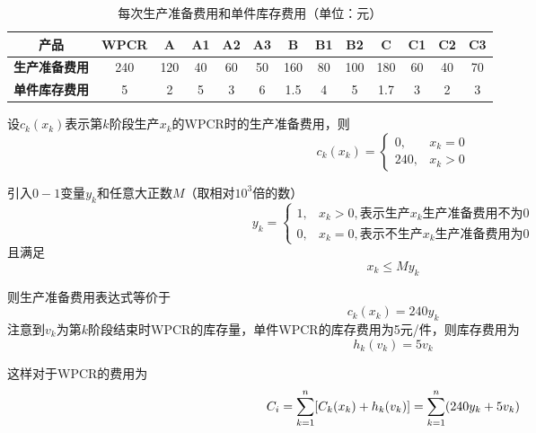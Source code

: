 \begin{table}[!hpt]
    \caption{每次生产准备费用和单件库存费用（单位：元）}
    \label{T.ch2-1}
    \centering
    \renewcommand\arraystretch{1.5} 
    \begin{tabular}{@{}ccccccccccccc@{}} 
    \toprule
    \textbf{产品} & \textbf{WPCR} & \textbf{A} & \textbf{A1} & \textbf{A2} & \textbf{A3} & \textbf{B} & \textbf{B1} & \textbf{B2} & \textbf{C} & \textbf{C1} & \textbf{C2} & \textbf{C3} \\
    \midrule
    \textbf{生产准备费用} & 240 & 120 & 40 & 60 & 50 & 160 & 80 & 100 & 180 & 60 & 40 & 70 \\ 
    \textbf{单件库存费用} & 5 & 2 & 5 & 3 & 6 & 1.5 & 4 & 5 & 1.7 & 3 & 2 & 3 \\
    \bottomrule
    \end{tabular}
\end{table}

设$c_k(x_k)$表示第$k$阶段生产$x_k$的WPCR时的生产准备费用，则
\begin{equation}
    c_k(x_k)=\begin{cases}
        0, & x_k=0\\
        240, & x_k>0
    \end{cases}
\end{equation}

引入$0-1$变量$y_k$和任意大正数$M$（取相对$10^3$倍的数）
\begin{equation}
    y_k=\begin{cases}
        1, & x_k>0,\text{表示生产}x_k\text{生产准备费用不为}0 \\
        0, & x_k=0,\text{表示不生产}x_k\text{生产准备费用为}0
    \end{cases}
\end{equation}
且满足
\begin{equation}
    x_k \leq My_k
\end{equation}

则生产准备费用表达式等价于
\begin{equation}
    c_k(x_k)=240y_k
\end{equation}
注意到$v_k$为第$k$阶段结束时WPCR的库存量，单件WPCR的库存费用为5元/件，则库存费用为
\begin{equation}
    h_k(v_k)=5v_k
\end{equation}

这样对于WPCR的费用为
\begin{equation}
    C_{\uppercase\expandafter{\romannumeral1}}=\sum_{k=1}^{n}[C_k(x_k)+h_k(v_k)]=\sum_{k=1}^{n}(240y_k+5v_k)
\end{equation}

